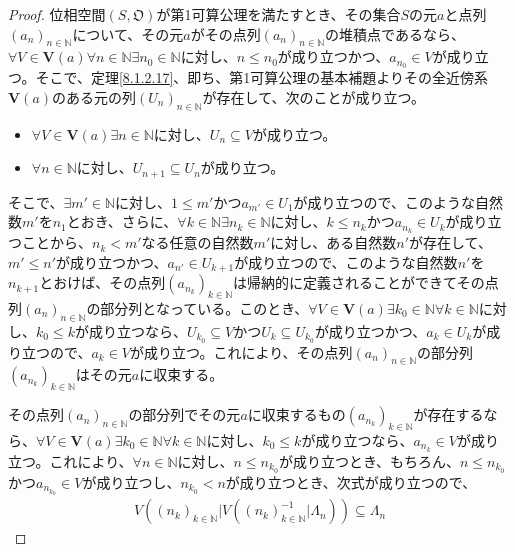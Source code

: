 \documentclass[dvipdfmx]{jsarticle}
\begin{document}
\begin{proof}
位相空間$\left( S,\mathfrak{O} \right)$が第1可算公理を満たすとき、その集合$S$の元$a$と点列$\left( a_{n} \right)_{n \in \mathbb{N}}$について、その元$a$がその点列$\left( a_{n} \right)_{n \in \mathbb{N}}$の堆積点であるなら、$\forall V \in \mathbf{V}(a)\forall n \in \mathbb{N}\exists n_{0} \in \mathbb{N}$に対し、$n \leq n_{0}$が成り立つかつ、$a_{n_{0}} \in V$が成り立つ。そこで、定理\ref{8.1.2.17}、即ち、第1可算公理の基本補題よりその全近傍系$\mathbf{V}(a)$のある元の列$\left( U_{n} \right)_{n \in \mathbb{N}}$が存在して、次のことが成り立つ。
\begin{itemize}
\item
  $\forall V \in \mathbf{V}(a)\exists n \in \mathbb{N}$に対し、$U_{n} \subseteq V$が成り立つ。
\item
  $\forall n \in \mathbb{N}$に対し、$U_{n + 1} \subseteq U_{n}$が成り立つ。
\end{itemize}
そこで、$\exists m' \in \mathbb{N}$に対し、$1 \leq m'$かつ$a_{m'} \in U_{1}$が成り立つので、このような自然数$m'$を$n_{1}$とおき、さらに、$\forall k \in \mathbb{N}\exists n_{k} \in \mathbb{N}$に対し、$k \leq n_{k}$かつ$a_{n_{k}} \in U_{k}$が成り立つことから、$n_{k} < m'$なる任意の自然数$m'$に対し、ある自然数$n'$が存在して、$m' \leq n'$が成り立つかつ、$a_{n'} \in U_{k + 1}$が成り立つので、このような自然数$n'$を$n_{k + 1}$とおけば、その点列$\left( a_{n_{k}} \right)_{k \in \mathbb{N}}$は帰納的に定義されることができてその点列$\left( a_{n} \right)_{n \in \mathbb{N}}$の部分列となっている。このとき、$\forall V \in \mathbf{V}(a)\exists k_{0} \in \mathbb{N}\forall k \in \mathbb{N}$に対し、$k_{0} \leq k$が成り立つなら、$U_{k_{0}} \subseteq V$かつ$U_{k} \subseteq U_{k_{0}}$が成り立つかつ、$a_{k} \in U_{k}$が成り立つので、$a_{k} \in V$が成り立つ。これにより、その点列$\left( a_{n} \right)_{n \in \mathbb{N}}$の部分列$\left( a_{n_{k}} \right)_{k \in \mathbb{N}}$はその元$a$に収束する。\par
その点列$\left( a_{n} \right)_{n \in \mathbb{N}}$の部分列でその元$a$に収束するもの$\left( a_{n_{k}} \right)_{k \in \mathbb{N}}$が存在するなら、$\forall V \in \mathbf{V}(a)\exists k_{0} \in \mathbb{N}\forall k \in \mathbb{N}$に対し、$k_{0} \leq k$が成り立つなら、$a_{n_{k}} \in V$が成り立つ。これにより、$\forall n \in \mathbb{N}$に対し、$n \leq n_{k_{0}}$が成り立つとき、もちろん、$n \leq n_{k_{0}}$かつ$a_{n_{k_{0}}} \in V$が成り立つし、$n_{k_{0}} < n$が成り立つとき、次式が成り立つので、
\begin{align*}
V\left( \left( n_{k} \right)_{k \in \mathbb{N}}|V\left( \left( n_{k} \right)_{k \in \mathbb{N}}^{- 1}|\varLambda_{n} \right) \right) \subseteq \varLambda_{n}

\end{align*}
\end{proof}
\end{document}

